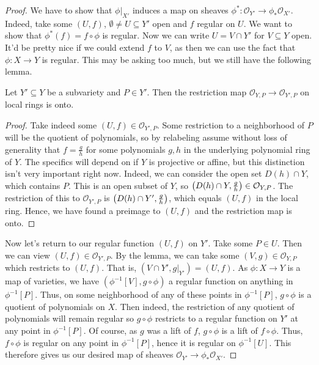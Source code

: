 \begin{proof}
    We have to show that $\phi|_{X'}$ induces a map on sheaves $\phi^*: \mathcal O_{Y'} \longrightarrow \phi_* \mathcal O_{X'}$. Indeed, take some $(U, f)$, $\emptyset \neq U \subseteq Y'$ open and $f$ regular on $U$. We want to show that $\phi^*(f) = f \circ \phi$ is regular. Now we can write $U = V \cap Y'$ for $V \subseteq Y$ open. It'd be pretty nice if we could extend $f$ to $V$, as then we can use the fact that $\phi: X \longrightarrow Y$ is regular. This may be asking too much, but we still have the following lemma.

    \begin{lemma}
        Let $Y' \subseteq Y$ be a subvariety and $P \in Y'$. Then the restriction map $\mathcal O_{Y, P} \longrightarrow \mathcal O_{Y', P}$ on local rings is onto.
    \end{lemma}
    \begin{proof}
        Take indeed some $(U, f) \in \mathcal O_{Y', P}$. Some restriction to a neighborhood of $P$ will be the quotient of polynomials, so by relabeling assume without loss of generality that $f = \frac{g}{h}$ for some polynomials $g, h$ in the underlying polynomial ring of $Y$. The specifics will depend on if $Y$ is projective or affine, but this distinction isn't very important right now. Indeed, we can consider the open set $D(h) \cap Y$, which contains $P$. This is an open subset of $Y$, so ${\left(D(h) \cap Y, \frac{g}{h}\right)} \in \mathcal O_{Y, P}$. The restriction of this to $\mathcal O_{Y', P}$ is ${\left(D(h) \cap Y', \frac{g}{h}\right)}$, which equals $(U, f)$ in the local ring. Hence, we have found a preimage to $(U, f)$ and the restriction map is onto.
    \end{proof}

    Now let's return to our regular function $(U, f)$ on $Y'$. Take some $P \in U$. Then we can view $(U, f) \in \mathcal O_{Y', P}$. By the lemma, we can take some $(V, g) \in \mathcal O_{Y, P}$ which restricts to $(U, f)$. That is, $(V \cap Y', g|_{Y'}) = (U, f)$. As $\phi: X \longrightarrow Y$ is a map of varieties, we have $(\phi^{-1}[V], g \circ \phi)$ a regular function on anything in $\phi^{-1}[P]$. Thus, on some neighborhood of any of these points in $\phi^{-1}[P]$, $g \circ \phi$ is a quotient of polynomials on $X$. Then indeed, the restriction of any quotient of polynomials will remain regular so $g \circ \phi$ restricts to a regular function on $Y'$ at any point in $\phi^{-1}[P]$. Of course, as $g$ was a lift of $f$, $g \circ \phi$ is a lift of $f \circ \phi$. Thus, $f \circ \phi$ is regular on any point in $\phi^{-1}[P]$, hence it is regular on $\phi^{-1}[U]$. This therefore gives us our desired map of sheaves $\mathcal O_{Y'} \longrightarrow \phi_* \mathcal O_{X'}$.
\end{proof}
